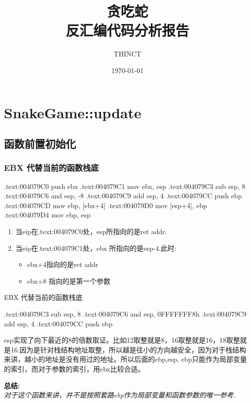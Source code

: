 \documentclass[AutoFakeBold,AutoFakeSlant]{beamer}
\title{\textbf{贪吃蛇}\\反汇编代码分析报告}
\date{\today}
\author{THINCT}
\begin{document}
	\maketitle 
	
	
	\section{SnakeGame::update}
	
	\subsection{函数前置初始化}
	
	\begin{frame}[fragile]
		\frametitle{EBX 代替当前的函数栈底}
		\begin{x86asmcode}
.text:004079C0  push    ebx
.text:004079C1  mov     ebx, esp
.text:004079C3  sub     esp, 8
.text:004079C6  and     esp, -8
.text:004079C9  add     esp, 4
.text:004079CC  push    ebp
.text:004079CD  mov     ebp, [ebx+4]
.text:004079D0  mov     [esp+4], ebp
.text:004079D4  mov     ebp, esp\end{x86asmcode}
		\begin{enumerate}
			\item 当eip在.text:004079C0处，esp所指向的是ret addr. 
			\item 当eip在.text:004079C1处，ebx 所指向的是esp-4.此时:
			\begin{itemize}
					\item ebx+4指向的是ret addr
					\item ebx+8 指向的是第一个参数
			\end{itemize}
		\end{enumerate}
	\end{frame}
	
	
	\begin{frame}[fragile]{EBX 代替当前的函数栈底}
        \begin{x86asmcode}
.text:004079C3  sub     esp, 8
.text:004079C6  and     esp, 0FFFFFFF8h 
.text:004079C9  add     esp, 4
.text:004079CC  push    ebp\end{x86asmcode} 
		esp实现了向下最近的8的倍数取证。比如12取整就是8，16取整就是16，18取整就是16.因为是针对栈结构地址取整，所以越是往小的方向越安全，因为对于栈结构来讲，越小的地址是没有用过的地址。所以后面的ebp,esp, ebp只能作为局部变量的索引，而对于参数的索引，用ebx比较合适。
		
		\textbf {总结:}\\
		\emph {对于这个函数来讲，并不是按照套路ebp作为局部变量和函数参数的唯一参考.} 
	\end{frame}
	
\end{document}
